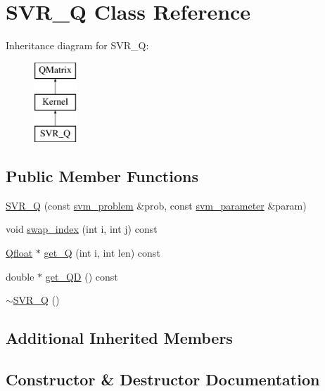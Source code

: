 \hypertarget{classSVR__Q}{}\section{S\+V\+R\+\_\+Q Class Reference}
\label{classSVR__Q}
Inheritance diagram for S\+V\+R\+\_\+Q\+:\begin{figure}[H]
\begin{center}
\leavevmode
\includegraphics[height=3.000000cm]{classSVR__Q}
\end{center}
\end{figure}
\subsection*{Public Member Functions}
\begin{DoxyCompactItemize}
\item 
\hyperlink{classSVR__Q_a348978e0cce4c0bf503dc825241eb4ff}{S\+V\+R\+\_\+Q} (const \hyperlink{structsvm__problem}{svm\+\_\+problem} \&prob, const \hyperlink{structsvm__parameter}{svm\+\_\+parameter} \&param)
\item 
void \hyperlink{classSVR__Q_a9d3884f0c68f4ce18d47570e4a203405}{swap\+\_\+index} (int i, int j) const 
\item 
\hyperlink{svm__core_8cpp_a8755d90a54ecfb8d15051af3e0542592}{Qfloat} $\ast$ \hyperlink{classSVR__Q_aba55078d17e7815f093ffa154f3cee9d}{get\+\_\+Q} (int i, int len) const 
\item 
double $\ast$ \hyperlink{classSVR__Q_ac22ed5ce1b0bf6a900c3c8d631e77d76}{get\+\_\+\+QD} () const 
\item 
\hyperlink{classSVR__Q_a2a8efdc1fef68cc5bc9d0d2669d24e36}{$\sim$\+S\+V\+R\+\_\+Q} ()
\end{DoxyCompactItemize}
\subsection*{Additional Inherited Members}


\subsection{Constructor \& Destructor Documentation}
